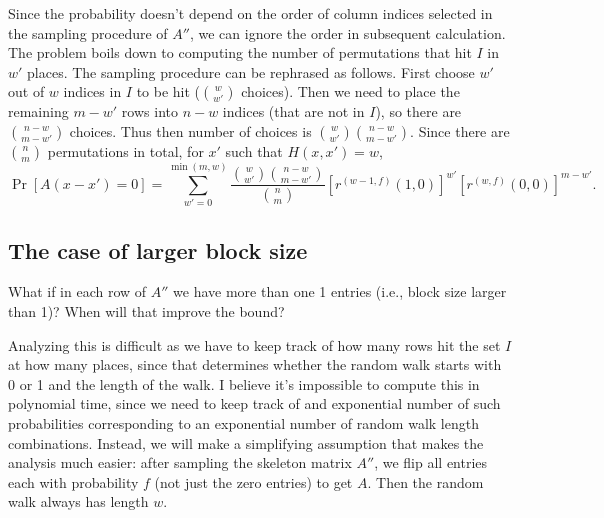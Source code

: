 \documentclass[11pt]{article}
\begin{document}
Since the probability doesn't depend on the order of column indices selected in
the sampling procedure of $A''$, we can ignore the order in subsequent
calculation.
The problem boils down to computing the number of permutations that hit $I$ in
$w'$ places.
The sampling procedure can be rephrased as follows. 
First choose $w'$ out of $w$ indices in $I$ to be hit ($\binom{w}{w'}$ choices).
Then we need to place the remaining $m - w'$ rows into $n - w$ indices (that are
not in $I$), so there are $\binom{n - w}{m - w'}$ choices.
Thus then number of choices is $\binom{w}{w'} \binom{n - w}{m - w'}$.
Since there are $\binom{n}{m}$ permutations in total, for $x'$ such that $H(x,
x') = w$,
\begin{equation}
  \Pr[A(x - x') = 0] =
  \sum_{w'=0}^{\min(m, w)}\frac{\binom{w}{w'} \binom{n - w}{m - w'}}{\binom{n}{m}}
  [r^{(w-1, f)}(1, 0)]^{w'} [r^{(w, f)}(0, 0)]^{m-w'}.  
  \label{eq:k_1_without_replacment}
\end{equation}

\subsection{The case of larger block size}
\label{subsec:block_size_larger}

What if in each row of $A''$ we have more than one 1 entries (i.e., block size
larger than 1)?
When will that improve the bound?

Analyzing this is difficult as we have to keep track of how many rows hit the
set $I$ at how many places, since that determines whether the random walk starts
with 0 or 1 and the length of the walk.
I believe it's impossible to compute this in polynomial time, since we need to
keep track of and exponential number of such probabilities corresponding to an
exponential number of random walk length combinations.
Instead, we will make a simplifying assumption that makes the analysis much
easier: after sampling the skeleton matrix $A''$, we flip all entries each with
probability $f$ (not just the zero entries) to get $A$.
Then the random walk always has length $w$.
\end{document}
